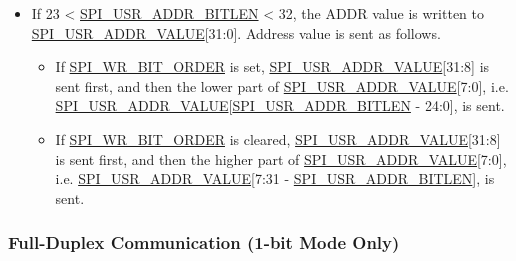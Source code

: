 \documentclass[main\_\_EN.tex]{subfiles}
\begin{document}
\begin{itemize}
\begin{itemize}
    \item If \hyperref[fielddesc:SPIWRBITORDER]{SPI\_WR\_BIT\_ORDER} is set, \hyperref[fielddesc:SPIUSRADDRVALUE]{SPI\_USR\_ADDR\_VALUE}[31:16] is sent first, and then the lower part of  \hyperref[fielddesc:SPIUSRADDRVALUE]{SPI\_USR\_ADDR\_VALUE}[15:8], i.e. \hyperref[fielddesc:SPIUSRADDRVALUE]{SPI\_USR\_ADDR\_VALUE}[\hyperref[fielddesc:SPIUSRADDRBITLEN]{SPI\_USR\_ADDR\_BITLEN} - 8:8], is sent.
    \item If \hyperref[fielddesc:SPIWRBITORDER]{SPI\_WR\_BIT\_ORDER} is cleared, \hyperref[fielddesc:SPIUSRADDRVALUE]{SPI\_USR\_ADDR\_VALUE}[31:16] is sent first, and then the higher part of \hyperref[fielddesc:SPIUSRADDRVALUE]{SPI\_USR\_ADDR\_VALUE}[15:8], i.e. \hyperref[fielddesc:SPIUSRADDRVALUE]{SPI\_USR\_ADDR\_VALUE}[15:31 - \hyperref[fielddesc:SPIUSRADDRBITLEN]{SPI\_USR\_ADDR\_BITLEN}], is sent.
\end{itemize}

\item If 23 < \hyperref[fielddesc:SPIUSRADDRBITLEN]{SPI\_USR\_ADDR\_BITLEN} < 32, the ADDR value is written to \hyperref[fielddesc:SPIUSRADDRVALUE]{SPI\_USR\_ADDR\_VALUE}[31:0]. Address value is sent as follows.

\begin{itemize}
    \item If \hyperref[fielddesc:SPIWRBITORDER]{SPI\_WR\_BIT\_ORDER} is set, \hyperref[fielddesc:SPIUSRADDRVALUE]{SPI\_USR\_ADDR\_VALUE}[31:8] is sent first, and then the lower part of  \hyperref[fielddesc:SPIUSRADDRVALUE]{SPI\_USR\_ADDR\_VALUE}[7:0], i.e. \hyperref[fielddesc:SPIUSRADDRVALUE]{SPI\_USR\_ADDR\_VALUE}[\hyperref[fielddesc:SPIUSRADDRBITLEN]{SPI\_USR\_ADDR\_BITLEN} - 24:0], is sent.
    \item If \hyperref[fielddesc:SPIWRBITORDER]{SPI\_WR\_BIT\_ORDER} is cleared, \hyperref[fielddesc:SPIUSRADDRVALUE]{SPI\_USR\_ADDR\_VALUE}[31:8] is sent first, and then the higher part of \hyperref[fielddesc:SPIUSRADDRVALUE]{SPI\_USR\_ADDR\_VALUE}[7:0], i.e. \hyperref[fielddesc:SPIUSRADDRVALUE]{SPI\_USR\_ADDR\_VALUE}[7:31 - \hyperref[fielddesc:SPIUSRADDRBITLEN]{SPI\_USR\_ADDR\_BITLEN}], is sent.
\end{itemize}

\end{itemize}

\subsubsection{Full-Duplex Communication (1-bit Mode Only)}\label{sec:spi-full-duplex-1-bit}
\end{document}
